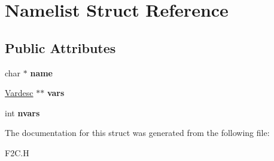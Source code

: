 \hypertarget{struct_namelist}{\section{Namelist Struct Reference}
\label{struct_namelist}
}
\subsection*{Public Attributes}
\begin{DoxyCompactItemize}
\item 
\hypertarget{struct_namelist_a43f48d333d37610aa80483ee76c78d26}{char $\ast$ {\bfseries name}}\label{struct_namelist_a43f48d333d37610aa80483ee76c78d26}

\item 
\hypertarget{struct_namelist_a5e41f1eccfc8b25536f76c1ced89c3fc}{\hyperlink{struct_vardesc}{Vardesc} $\ast$$\ast$ {\bfseries vars}}\label{struct_namelist_a5e41f1eccfc8b25536f76c1ced89c3fc}

\item 
\hypertarget{struct_namelist_a30a6e0a05803290fed780890bcc436fa}{int {\bfseries nvars}}\label{struct_namelist_a30a6e0a05803290fed780890bcc436fa}

\end{DoxyCompactItemize}


The documentation for this struct was generated from the following file\+:\begin{DoxyCompactItemize}
\item 
F2\+C.\+H\end{DoxyCompactItemize}
